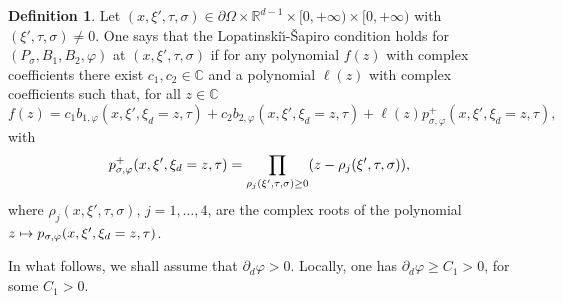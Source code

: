 \documentclass[JEP,XML,SOM,Unicode,published]{cedram}
\newcommand\mto{\mathchoice{\longmapsto}{\mapsto}{\mapsto}{\mapsto}}
\theoremstyle{plain}
\theoremstyle{definition}
\newtheorem{definition}[theorem]{Definition}
\def\R{\mathbb{R}}
\def\C{\mathbb{C}}
\newcommand{\LS}{Lopatinski\u{\i}-\v{S}apiro\xspace}
\let \Im \relax
\DeclareMathOperator{\Im}{Im}
\newcommand{\Psig}{P_{\sigma}}
\newcommand{\pconj}{p_{\sigma,\varphi}}
\begin{document}
\begin{definition}\label{def: LS after conjugation}
Let
$(x,\xi',\tau,\sigma)\in
\partial\Omega\times\R^{d-1}\times[0,+\infty) \times
[0,+\infty)$ with
$(\xi',\tau,\sigma)\neq0$. One says that the \LS condition holds for
$(\Psig ,B_1, B_2, \varphi)$ at $(x,\xi',\tau,\sigma)$ if for
any polynomial $f(z)$ with complex coefficients there
exist $c_1, c_2\in\C$ and a polynomial
$\ell(z)$ with complex coefficients such that, for all
$z\in\C$
\[
f(z)=c_1 b_{1,\varphi}(x,\xi',\xi_d=z,\tau)
+c_2b_{2,\varphi}(x,\xi',\xi_d=z,\tau)
+\ell(z) \pconj^+(x,\xi',\xi_d=z,\tau),
\]
with
\begin{equation*}
\pconj^+ (x,\xi',\xi_d=z,\tau)
=\prod_{\Im\rho_j(\xi',\tau,\sigma)\geq
0}(z-\rho_j(\xi',\tau,\sigma)),
\end{equation*}
where $\rho_j(x,\xi',\tau,\sigma)$, $j=1,\dots,4$, are the complex
roots of the polynomial $z\mto \pconj(x,\xi',\xi_d=z,\tau)$.
\end{definition}
In what follows, we shall assume that $\partial_d\varphi>0$.
Locally, one has $\partial_d\varphi\geq C_1>0$, for some $C_1>0$.
\end{document}
